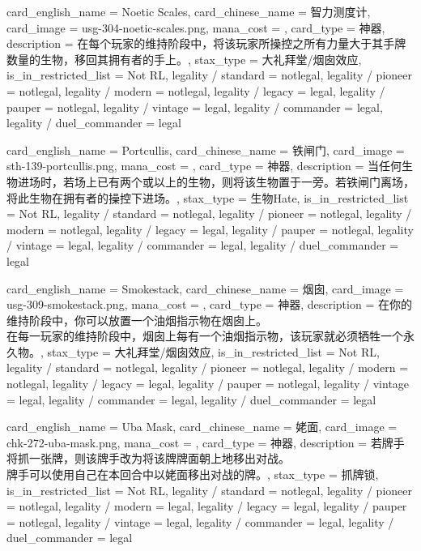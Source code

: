 \documentclass[lang = cn, color = black, 10pt]{AllThatStax}
\begin{document}
\card
{
	card_english_name = {Noetic Scales},
	card_chinese_name = {智力测度计},
	card_image = usg-304-noetic-scales.png,
	mana_cost = ,
	card_type = 神器,
	description = {在每个玩家的维持阶段中，将该玩家所操控之所有力量大于其手牌数量的生物，移回其拥有者的手上。},
	stax_type = 大礼拜堂/烟囱效应,
	is_in_restricted_list = Not RL,
	legality / standard = notlegal,
	legality / pioneer = notlegal,
	legality / modern = notlegal,
	legality / legacy = legal,
	legality / pauper = notlegal,
	legality / vintage = legal,
	legality / commander = legal,
	legality / duel_commander = legal
}

\card
{
	card_english_name = {Portcullis},
	card_chinese_name = {铁闸门},
	card_image = sth-139-portcullis.png,
	mana_cost = ,
	card_type = 神器,
	description = {当任何生物进场时，若场上已有两个或以上的生物，则将该生物置于一旁。若铁闸门离场，将此生物在拥有者的操控下进场。},
	stax_type = 生物Hate,
	is_in_restricted_list = Not RL,
	legality / standard = notlegal,
	legality / pioneer = notlegal,
	legality / modern = notlegal,
	legality / legacy = legal,
	legality / pauper = notlegal,
	legality / vintage = legal,
	legality / commander = legal,
	legality / duel_commander = legal
}

\card
{
	card_english_name = {Smokestack},
	card_chinese_name = {烟囱},
	card_image = usg-309-smokestack.png,
	mana_cost = ,
	card_type = 神器,
	description = {在你的维持阶段中，你可以放置一个油烟指示物在烟囱上。\\
在每一玩家的维持阶段中，烟囱上每有一个油烟指示物，该玩家就必须牺牲一个永久物。},
	stax_type = 大礼拜堂/烟囱效应,
	is_in_restricted_list = Not RL,
	legality / standard = notlegal,
	legality / pioneer = notlegal,
	legality / modern = notlegal,
	legality / legacy = legal,
	legality / pauper = notlegal,
	legality / vintage = legal,
	legality / commander = legal,
	legality / duel_commander = legal
}

\card
{
	card_english_name = {Uba Mask},
	card_chinese_name = {姥面},
	card_image = chk-272-uba-mask.png,
	mana_cost = ,
	card_type = 神器,
	description = {若牌手将抓一张牌，则该牌手改为将该牌牌面朝上地移出对战。\\
牌手可以使用自己在本回合中以姥面移出对战的牌。},
	stax_type = 抓牌锁,
	is_in_restricted_list = Not RL,
	legality / standard = notlegal,
	legality / pioneer = notlegal,
	legality / modern = legal,
	legality / legacy = legal,
	legality / pauper = notlegal,
	legality / vintage = legal,
	legality / commander = legal,
	legality / duel_commander = legal
}
\end{document}
